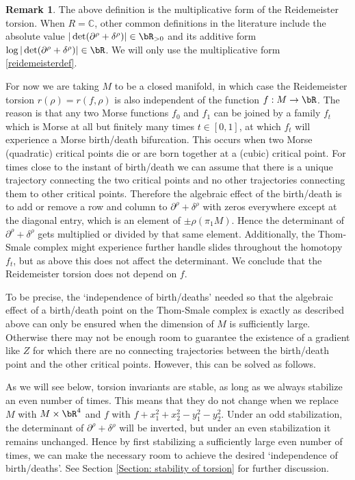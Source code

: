 \documentclass[JEP,XML,SOM,Unicode,NoFloatCountersInSection]{cedram}
\theoremstyle{plain}
\theoremstyle{definition}
\newtheorem{remark}[theorem]{Remark}
\newcommand{\bC}{\mathbb{C}}\newcommand{\bD}{\mathbb{D}}
\begin{document}
\begin{remark}
The above definition is the multiplicative form of the Reidemeister torsion. When $R=\bC$, other common definitions in the literature include the absolute value $|\det(\partial^\rho+\delta^\rho)| \in \bR_{>0}$ and its additive form $\log |\det(\partial^\rho+\delta^\rho)| \in \bR$. We will only use the multiplicative form \ref{reidemeisterdef}.
\end{remark}

For now we are taking $M$ to be a closed manifold, in which case the Reidemeister torsion $r(\rho)=r(f, \rho)$ is also independent of the function $f:M \to \bR$. The reason is that any two Morse functions $f_0$ and $f_1$ can be joined by a family $f_t$ which is Morse at all but finitely many times $t \in [0,1]$, at which $f_t$ will experience a Morse birth/death bifurcation. This occurs when two Morse (quadratic) critical points die or are born together at a (cubic) critical point. For times close to the instant of birth/death we can assume that there is a unique trajectory connecting the two critical points and no other trajectories connecting them to other critical points. Therefore the algebraic effect of the birth/death is to add or remove a row and column to $\partial^\rho+\delta^\rho$ with zeros everywhere except at the diagonal entry, which is an element of $\pm \rho( \pi_1M)$. Hence the determinant of $\partial^\rho+\delta^\rho$ gets multiplied or divided by that same element. Additionally, the Thom-Smale complex might experience further handle slides throughout the homotopy $f_t$, but as above this does not affect the determinant. We conclude that the Reidemeister torsion does not depend on $f$.

To be precise, the `independence of birth/deaths' needed so that the algebraic effect of a birth/death point on the Thom-Smale complex is exactly as described above can only be ensured when the dimension of $M$ is sufficiently large. Otherwise there may not be enough room to guarantee the existence of a gradient like $Z$ for which there are no connecting trajectories between the birth/death point and the other critical points. However, this can be solved as follows.

As we will see below, torsion invariants are stable, as long as we always stabilize an even number of times. This means that they do not change when we replace $M$ with $M \times \bR^4$ and $f$ with $f +x_1^2+x_2^2 - y_1^2- y_2^2$. Under an odd stabilization, the determinant of $\partial^\rho+\delta^\rho$ will be inverted, but under an even stabilization it remains unchanged. Hence by first stabilizing a sufficiently large even number of times, we can make the necessary room to achieve the desired `independence of birth/deaths'. See Section \ref{Section: stability of torsion} for further discussion.
\end{document}
